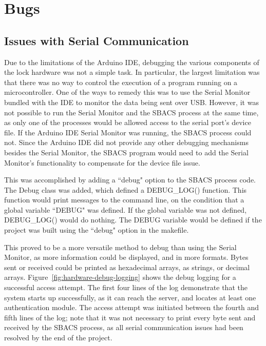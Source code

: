 \documentclass[12pt]{report}
\let\Oldsection\section
\renewcommand{\section}{\FloatBarrier\Oldsection}
\let\Oldsubsection\subsection
\renewcommand{\subsection}{\FloatBarrier\Oldsubsection}
\begin{document}
\section{Bugs} \label{bugs}

\subsection{Issues with Serial Communication} \label{issues-with-serial-communcation}

Due to the limitations of the Arduino IDE, debugging the various components of the lock hardware was not a simple task. 
In particular, the largest limitation was that there was no way to control the execution of a program running on a 
microcontroller. One of the ways to remedy this was to use the Serial Monitor bundled with the IDE to monitor the data 
being sent over USB. However, it was not possible to run the Serial Monitor and the SBACS process at the same time, as 
only one of the processes would be allowed access to the serial port's device file. If the Arduino IDE Serial Monitor 
was running, the SBACS process could not. Since the Arduino IDE did not provide any other debugging mechanisms besides 
the Serial Monitor, the SBACS program would need to add the Serial Monitor's functionality to compensate for the device 
file issue.

This was accomplished by adding a ``debug" option to the SBACS process code. The Debug class was added, which defined a 
DEBUG\_LOG() function. This function would print messages to the command line, on the condition that a global variable 
``DEBUG" was defined. If the global variable was not defined, DEBUG\_LOG() would do nothing. The DEBUG variable would be 
defined if the project was built using the ``debug" option in the makefile.

This proved to be a more versatile method to debug than using the Serial Monitor, as more information could be 
displayed, and in more formats. Bytes sent or received could be printed as hexadecimal arrays, as strings, or decimal 
arrays. Figure~\ref{fig:hardware-debug-logging} shows the debug logging for a successful access attempt. The first four 
lines of the log demonstrate that the system starts up successfully, as it can reach the server, and locates at least 
one authentication module. The access attempt was initiated between the fourth and fifth lines of the log; note that it 
was not necessary to print every byte sent and received by the SBACS process, as all serial communication issues 
had been resolved by the end of the project.
\end{document}

